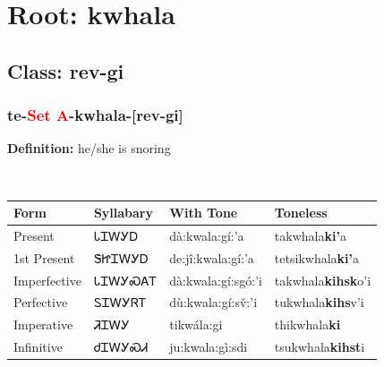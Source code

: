 \needspace{4in}
\section*{Root: kwhala}
\nopagebreak
{}
\needspace{3in}
\subsection*{Class: rev-gi}
\nopagebreak
\needspace{2in}
\subsubsection*{te{-}\textcolor{Red}{Set A}{-}\textbf{kwhala}{-}[rev-gi]}
\nopagebreak
\textbf{Definition: } he/she is snoring
\\[0.5em]
\begin{tabularx}{\textwidth}{l X X X}%
\toprule%
\textbf{Form}&\textbf{Syllabary}&\textbf{With Tone}&\textbf{Toneless}\\%
\midrule%
Present&ᏓᏆᎳᎩᎠ&dà:kwala:gí:’a&takwhala\textbf{ki'}a\\%
1st Present&ᏕᏥᏆᎳᎩᎠ&de:jî:kwala:gí:’a&tetsikwhala\textbf{ki'}a\\%
Imperfective&ᏓᏆᎳᎩᏍᎪᎢ&dà:kwala:gí:sgó:’i&takwhala\textbf{kihsk}o'i\\%
Perfective&ᏚᏆᎳᎩᏒᎢ&dù:kwala:gí:sv̌:’i&tukwhala\textbf{kihs}v'i\\%
Imperative&ᏘᏆᎳᎩ&tikwála:gi&thikwhala\textbf{ki}\\%
Infinitive&ᏧᏆᎳᎩᏍᏗ&ju:kwala:gì:sdi&tsukwhala\textbf{kihst}i\\%
\bottomrule%
\end{tabularx}
\\[1em]